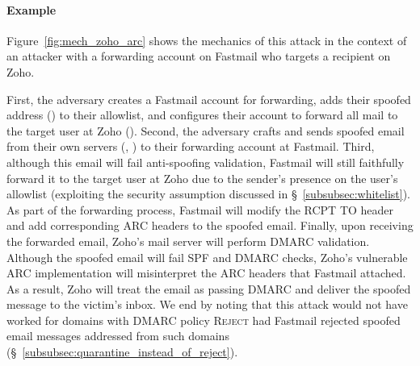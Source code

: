 \paragraph{Example}
Figure~\ref{fig:mech_zoho_arc} shows the mechanics of this attack
in the context of an attacker with a forwarding account on Fastmail who targets a recipient on Zoho.

First,
the adversary creates a Fastmail account for forwarding, adds their spoofed address
() to their allowlist, and configures their
account to forward all mail to the target user at Zoho
().
Second, the adversary crafts and sends
spoofed email from their own servers (\eg, )
to their forwarding account at Fastmail.
Third, although this email will fail anti-spoofing validation, Fastmail will still faithfully forward it to the target user at Zoho due to the sender's presence on the user's allowlist (exploiting the security assumption discussed in \S~\ref{subsubsec:whitelist}). 
As part of the forwarding process,
Fastmail will modify the RCPT TO header and add corresponding ARC headers to the
spoofed email.
Finally, upon receiving the forwarded email, Zoho's mail server will perform DMARC validation.
Although the spoofed email will fail SPF and DMARC checks,
Zoho's vulnerable ARC implementation
will misinterpret the ARC headers that Fastmail attached.
As a result, Zoho will treat the email as passing
DMARC and deliver the spoofed message to the victim's inbox. We end by noting that this attack would not have worked for domains with DMARC policy \textsc{Reject} had Fastmail rejected spoofed email messages addressed from such domains (\S~\ref{subsubsec:quarantine_instead_of_reject}).


